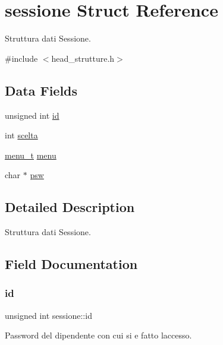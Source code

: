 \hypertarget{structsessione}{}\section{sessione Struct Reference}
\label{structsessione}


Struttura dati Sessione.  




{\ttfamily \#include $<$head\+\_\+strutture.\+h$>$}

\subsection*{Data Fields}
\begin{DoxyCompactItemize}
\item 
unsigned int \hyperlink{structsessione_a5adbdae5cd145f9af5be9cb2872c547e}{id}
\item 
int \hyperlink{structsessione_a8b53563de0ac5e415e1c596b97f0cece}{scelta}
\item 
\hyperlink{head__strutture_8h_a27938a0a874a833cfee26456c5d730b1}{menu\+\_\+t} \hyperlink{structsessione_a5ba535ae5fd4f4d4c4292de894fd2d46}{menu}
\item 
char $\ast$ \hyperlink{structsessione_a7db36e3c06e5950e589fe1af8f6deb0d}{psw}
\end{DoxyCompactItemize}


\subsection{Detailed Description}
Struttura dati Sessione. 

\subsection{Field Documentation}
\mbox{\label{structsessione_a5adbdae5cd145f9af5be9cb2872c547e}} 
\subsubsection{\texorpdfstring{id}{id}}
{\footnotesize\ttfamily unsigned int sessione\+::id}

Password del dipendente con cui si e\textquotesingle{} fatto l\textquotesingle{}accesso. \mbox{\label{structsessione_a5ba535ae5fd4f4d4c4292de894fd2d46}} 
